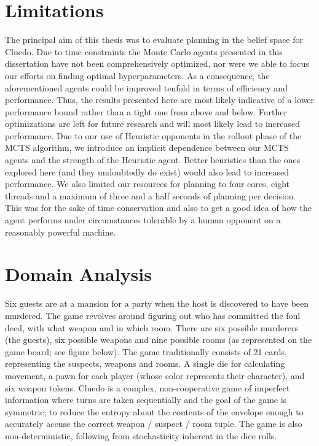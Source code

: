 \documentclass[msc, ai, twoside, notimes, logo, parskip, leftchapter, normalheadings]{infthesis}
\begin{document}
\section{Limitations}
The principal aim of this thesis was to evaluate planning in the belief space for Cluedo. Due to time constraints the Monte Carlo agents presented in this dissertation have not been comprehensively optimized, nor were we able to focus our efforts on finding optimal hyperparameters. As a consequence, the aforementioned agents could be improved tenfold in terms of efficiency and performance. Thus, the results presented here are most likely indicative of a lower performance bound rather than a tight one from above and below. Further optimizations are left for future research and will most likely lead to increased performance. Due to our use of Heuristic opponents in the rollout phase of the MCTS algorithm, we introduce an implicit dependence between our MCTS agents and the strength of the Heuristic agent. Better heuristics than the ones explored here (and they undoubtedly do exist) would also lead to increased performance. We also limited our resources for planning to four cores, eight threads and a maximum of three and a half seconds of planning per decision. This was for the sake of time conservation and also to get a good idea of how the agent performs under circumstances tolerable by a human opponent on a reasonably powerful machine. 

\section{Domain Analysis}
Six guests are at a mansion for a party when the host is discovered to have been murdered. The game revolves around figuring out who has committed the foul deed, with what weapon and in which room. There are six possible murderers (the guests), six possible weapons and nine possible rooms (as represented on the game board; see figure below). The game traditionally consists of 21 cards, representing the suspects, weapons and rooms. A single die for calculating movement, a pawn for each player (whose color represents their character), and six weapon tokens. Cluedo is a complex, non-cooperative game of imperfect information where turns are taken sequentially and the goal of the game is symmetric; to reduce the entropy about the contents of the envelope enough to accurately accuse the correct weapon / suspect / room tuple. The game is also non-deterministic, following from stochasticity inherent in the dice rolls.
\end{document}
